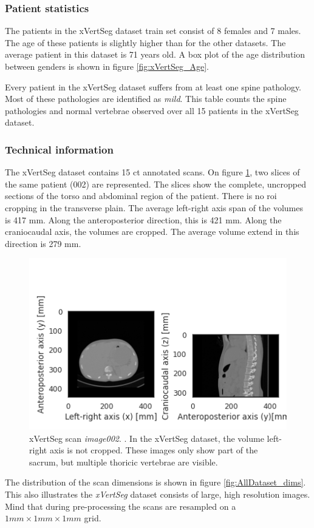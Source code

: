 \subsubsection{Patient statistics}

The patients in the xVertSeg dataset train set consist of 8 females and 7 males.
The age of these patients is slightly higher than for the other datasets.
The average patient in this dataset is 71 years old.
A box plot of the age distribution between genders is shown in figure \ref{fig:xVertSeg_Age}. 

\begin{table}
    \centering
        
        \caption{Every patient in the xVertSeg dataset suffers from at least one spine pathology.
        Most of these pathologies are identified as \textit{mild}.
        This table counts the spine pathologies and normal vertebrae observed over all 15 patients in the xVertSeg dataset.}   
\end{table}

\subsubsection{Technical information}

The xVertSeg dataset contains 15 \acrshort{ct} annotated scans. 
On figure \ref{fig:xVertSeg_image002}, two slices of the same patient (002) are represented.
The slices show the complete, uncropped sections of the torso and abdominal region of the patient. 
There is no \acrshort{roi} cropping in the transverse plain.
The average left-right axis span of the volumes is 417 mm. Along the anteroposterior direction, this is 421 mm. 
Along the craniocaudal axis, the volumes are cropped. The average volume extend in this direction is 279 mm.

\begin{figure}
    \centering
    \includegraphics[width=.95\textwidth]{automated_graphs/xVertSeg_image002.png}
    \caption{xVertSeg scan \textit{image002}. \label{fig:xVertSeg_image002}. In the xVertSeg dataset, the volume left-right axis is not cropped. These images only show part of the sacrum, but multiple thoricic vertebrae are visible.}
\end{figure}

The distribution of the scan dimensions is shown in figure \ref{fig:AllDataset_dims}. This also illustrates the \textit{xVertSeg} dataset consists of large, high resolution images.
Mind that during pre-processing the scans are resampled on a $1mm \times 1mm \times 1mm$ grid.